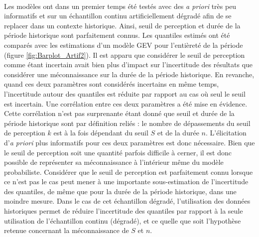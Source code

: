 	\paragraph{} Les modèles ont dans un premier temps été testés avec des \textit{a priori} très peu informatifs et sur un échantillon continu artificiellement dégradé afin de se replacer dans un contexte historique. Ainsi, seuil de perception et durée de la période historique sont parfaitement connus. Les quantiles estimés ont été comparés avec les estimations d'un modèle GEV pour l'entièreté de la période (figure \ref{fig:Barplot_Artif2}). Il est apparu que considérer le seuil de perception comme étant incertain avait bien plus d'impact sur l'incertitude des résultats que considérer une méconnaissance sur la durée de la période historique. En revanche, quand ces deux paramètres sont considérés incertains en même temps, l'incertitude autour des quantiles est réduite par rapport au cas où seul le seuil est incertain. Une corrélation entre ces deux paramètres a été mise en évidence. Cette corrélation n'est pas surprenante étant donné que seuil et durée de la période historique sont par définition reliés : le nombre de dépassements du seuil de perception $k$ est à la fois dépendant du seuil $S$ et de la durée $n$. L'élicitation d'\textit{a priori} plus informatifs pour ces deux paramètres est donc nécessaire. Bien que le seuil de perception soit une quantité parfois difficile à cerner, il est donc possible de représenter sa méconnaissance à l'intérieur même du modèle probabiliste. Considérer que le seuil de perception est parfaitement connu lorsque ce n'est pas le cas peut mener à une importante sous-estimation de l'incertitude des quantiles, de même que pour la durée de la période historique, dans une moindre mesure. Dans le cas de cet échantillon dégradé, l'utilisation des données historiques permet de réduire l'incertitude des quantiles par rapport à la seule utilisation de l'échantillon continu (dégradé), et ce quelle que soit l'hypothèse retenue concernant la méconnaissance de $S$ et $n$.
	
